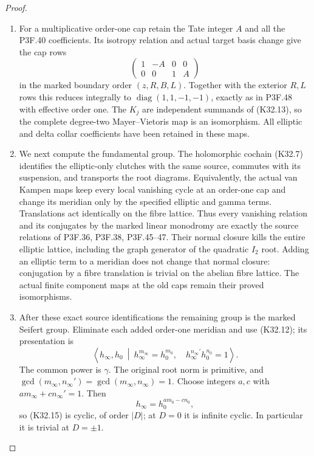 \begin{proof}
\begin{enumerate}[label=\arabic*.]
\item For a multiplicative order-one cap retain the Tate
integer $A$ and all the P3F.40 coefficients. Its
isotropy relation and actual target basis change give
the cap rows
\[
                 \begin{pmatrix}1&-A&0&0\\0&0&1&A\end{pmatrix}
\]
in the marked boundary order $(z,R,B,L)$. Together
with the exterior $R,L$ rows this reduces integrally
to $\operatorname{diag}(1,1,-1,-1)$, exactly as in
P3F.48 with effective order one. The $K_j$ are
independent summands of (K32.13), so the complete
degree-two Mayer--Vietoris map is an isomorphism.
All elliptic and delta collar coefficients have been
retained in these maps.

\item We next compute the fundamental group. The holomorphic
cochain (K32.7) identifies the elliptic-only clutches
with the same source, commutes with its suspension,
and transports the root diagrams. Equivalently, the
actual van Kampen maps keep every local vanishing
cycle at an order-one cap and change its meridian
only by the specified elliptic and gamma terms.
Translations act identically on the fibre lattice.
Thus every vanishing relation and its conjugates by
the marked linear monodromy are exactly the source
relations of P3F.36, P3F.38, P3F.45--47. Their normal
closure kills the entire elliptic lattice, including
the graph generator of the quadratic $I_2$ root.
Adding an elliptic term to a meridian does not change
that normal closure: conjugation by a fibre translation
is trivial on the abelian fibre lattice. The actual
finite component maps at the old caps remain their
proved isomorphisms.

\item After these exact source identifications the remaining
group is the marked Seifert group. Eliminate each
added order-one meridian and use (K32.12); its
presentation is
\[
 \left\langle h_\infty,h_0\ \middle|\
 h_\infty^{m_\infty}=h_0^{m_0},\quad
 h_\infty^{n_\infty'}h_0^{n_0}=1\right\rangle.          \tag{K32.15}
\]
The common power is $\gamma$. The original root norm
is primitive, and
$\gcd(m_\infty,n_\infty')=
\gcd(m_\infty,n_\infty)=1$. Choose integers $a,c$
with $am_\infty+cn_\infty'=1$. Then
\[
          h_\infty=h_0^{am_0-cn_0},
\]
so (K32.15) is cyclic, of order $|D|$; at $D=0$
it is infinite cyclic. In particular it is trivial
at $D=\pm1$.


\end{enumerate}
\end{proof}
